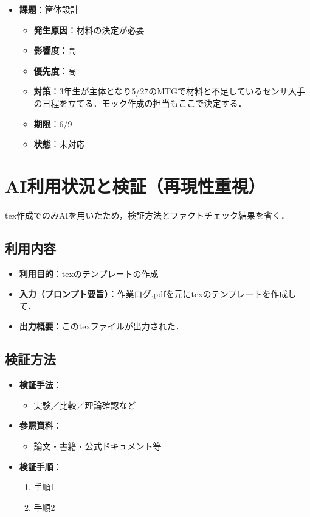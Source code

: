 \documentclass[a4paper,12pt]{ltjsarticle}
\begin{document}
\begin{itemize}
  \item \textbf{課題}：筐体設計
    \begin{itemize}
      \item \textbf{発生原因}：材料の決定が必要
      \item \textbf{影響度}：高
      \item \textbf{優先度}：高
      \item \textbf{対策}：3年生が主体となり5/27のMTGで材料と不足しているセンサ入手の日程を立てる．モック作成の担当もここで決定する．
      \item \textbf{期限}：6/9
      \item \textbf{状態}：未対応
    \end{itemize}
\end{itemize}


\section{AI利用状況と検証（再現性重視）}
tex作成でのみAIを用いたため，検証方法とファクトチェック結果を省く．

\subsection{利用内容}
\begin{itemize}
  \item \textbf{利用目的}：texのテンプレートの作成
  \item \textbf{入力（プロンプト要旨）}：作業ログ.pdfを元にtexのテンプレートを作成して．
  \item \textbf{出力概要}：このtexファイルが出力された．
\end{itemize}

\subsection{検証方法}

\begin{itemize}
  \item \textbf{検証手法}：
    \begin{itemize}
      \item 実験／比較／理論確認など
    \end{itemize}
  \item \textbf{参照資料}：
    \begin{itemize}
      \item 論文・書籍・公式ドキュメント等
    \end{itemize}
  \item \textbf{検証手順}：
    \begin{enumerate}
      \item 手順1
      \item 手順2
    \end{enumerate}
\end{itemize}
\end{document}
